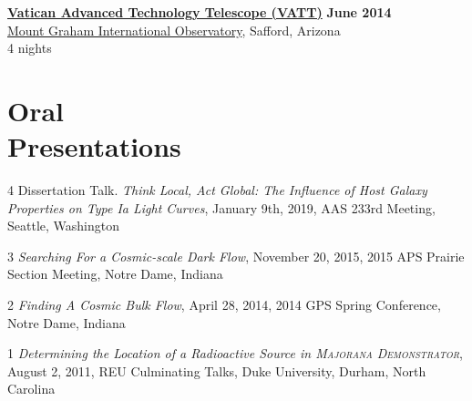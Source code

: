 \documentclass[margin]{res}
\begin{document}
\begin{resume}
{\href{http://vaticanobservatory.org/VATT/}{\bf  Vatican Advanced Technology Telescope (VATT)}} \hfill \textbf{June 2014} \\
\href{http://mgio.arizona.edu}{Mount Graham International Observatory}, Safford, Arizona \\
4 nights










\section{Oral \\Presentations}

\hangindent=15pt {\footnotesize \textcolor{light-gray}{4}} Dissertation Talk. {\sl Think Local, Act Global: The Influence of Host Galaxy Properties on Type Ia Light Curves}, January 9th, 2019,
AAS 233rd Meeting, Seattle, Washington
\vspace{-12pt}

\hangindent=15pt {\footnotesize \textcolor{light-gray}{3}} {\sl Searching For a Cosmic-scale Dark Flow}, November 20, 2015,
2015 APS Prairie Section Meeting, Notre Dame, Indiana
\vspace{-12pt}

\hangindent=15pt {\footnotesize \textcolor{light-gray}{2}} {\sl Finding A Cosmic Bulk Flow}, April 28, 2014, 2014 GPS Spring Conference, Notre Dame, Indiana
\vspace{-12pt}

\hangindent=15pt {\footnotesize \textcolor{light-gray}{1}} {\sl Determining the Location of a Radioactive Source in \textsc{Majorana Demonstrator}}, August 2, 2011, REU Culminating Talks, Duke University, Durham, North Carolina

\begin{comment}
{\sl Searching For a Cosmic-scale Dark Flow} \hfill {\bf November 20, 2015}\\
2015 APS Prairie Section Meeting, Notre Dame

{\sl Finding A Cosmic Bulk Flow} \hfill {\bf April 28, 2014}\\
2014 GPS Spring Conference, Notre Dame 

{\sl Determining the Location of a Radioactive Source in \textsc{Majorana}} \hfill {\bf August 2, 2011} \\
{\sl\textsc{Demonstrator}} \\
REU Culminating Talks,
Duke University %
\end{comment}





\end{resume}
\end{document}

